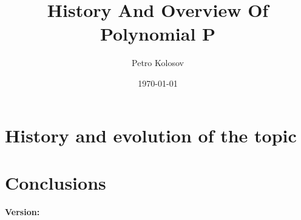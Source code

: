 \documentclass[12pt,letterpaper,oneside,reqno]{amsart}
\title[History And Overview Of Polynomial P]
{History And Overview Of Polynomial P}
\author[Petro Kolosov]{Petro Kolosov}
\date{\today}
\numberwithin{equation}{section}
\begin{document}
    \begin{abstract}
        
    \end{abstract}

    \maketitle

    \tableofcontents


    \section{History and evolution of the topic} \label{sec:introduction}
    


    \section{Conclusions}\label{sec:conclusions}
    

    
    
    \noindent \textbf{Version:} 
\end{document}
